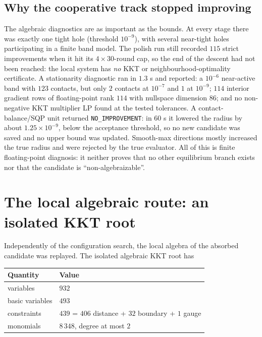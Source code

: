 \subsection{Why the cooperative track stopped improving}

The algebraic diagnostics are as important as the bounds. At every stage there was exactly one
tight hole (threshold $10^{-9}$), with several near-tight holes participating in a finite band
model. The polish run still recorded $115$ strict improvements when it hit its $4\times30$-round
cap, so the end of the descent had not been reached: the local system has \emph{no} KKT or
neighbourhood-optimality certificate. A stationarity diagnostic ran in $1.3$ s and reported: a
$10^{-6}$ near-active band with $123$ contacts, but only $2$ contacts at $10^{-7}$ and $1$ at
$10^{-9}$; $114$ interior gradient rows of floating-point rank $114$ with nullspace dimension $86$;
and no non-negative KKT multiplier LP found at the tested tolerances. A contact-balance/SQP unit
returned \texttt{NO\_\allowbreak{}IMPROVEMENT}: in $60$ s it lowered the radius by about $1.25\times10^{-9}$,
below the acceptance threshold, so no new candidate was saved and no upper bound was updated.
Smooth-max directions mostly increased the true radius and were rejected by the true evaluator.
All of this is finite floating-point diagnosis: it neither proves that no other equilibrium branch
exists nor that the candidate is ``non-algebraizable''.

\section{The local algebraic route: an isolated KKT root}

Independently of the configuration search, the local algebra of the absorbed candidate was
replayed. The isolated algebraic KKT root has

\begin{center}
\footnotesize
\begin{tabular}{@{}ll@{}}
\toprule
Quantity & Value \\
\midrule
variables & $932$ \\
basic variables & $493$ \\
constraints & $439$ = $406$ distance + $32$ boundary + $1$ gauge \\
monomials & $8\,348$, degree at most $2$ \\
\bottomrule
\end{tabular}
\end{center}

